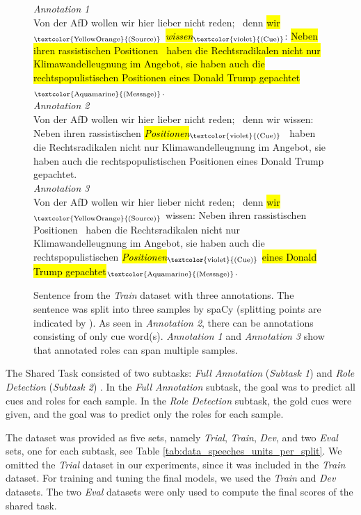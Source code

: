 \documentclass[11pt,a4paper]{article}
\newcommand{\cue}[1]{\sethlcolor{cue}\hl{\emph{#1}}$_{\text{\textcolor{violet}{(Cue)}}}$}
\newcommand{\source}[1]{\sethlcolor{source}\hl{#1}$_{\text{\textcolor{YellowOrange}{(Source)}}}$}
\newcommand{\msg}[1]{\sethlcolor{message}\hl{#1}$_{\text{\textcolor{Aquamarine}{(Message)}}}$}
\begin{document}
\begin{figure}[t]
    \centering
    \begin{mdframed}[
            leftmargin=0pt,
            rightmargin=0pt,
            skipabove=0pt,
            skipbelow=0pt,
        ]
        \small
        \emph{Annotation 1}
        \\
        Von der AfD wollen wir hier lieber nicht reden; \ddag\, denn \source{wir} \cue{wissen}: \msg{Neben ihren rassistischen Positionen \ddag\, haben die Rechtsradikalen nicht nur Klimawandelleugnung im Angebot, sie haben auch die rechtspopulistischen Positionen eines Donald Trump gepachtet}.
        \\

        \emph{Annotation 2}
        \\
        Von der AfD wollen wir hier lieber nicht reden; \ddag\, denn wir wissen: Neben ihren rassistischen \cue{Positionen} \ddag\, haben die Rechtsradikalen nicht nur Klimawandelleugnung im Angebot, sie haben auch die rechtspopulistischen Positionen eines Donald Trump gepachtet.
        \\

        \emph{Annotation 3}
        \\
        Von der AfD wollen wir hier lieber nicht reden; \ddag\, denn \source{wir} wissen: Neben ihren rassistischen Positionen \ddag\, haben die Rechtsradikalen nicht nur Klimawandelleugnung im Angebot, sie haben auch die rechtspopulistischen \cue{Positionen} \msg{eines Donald Trump gepachtet}.
    \end{mdframed}
    \caption{
        Sentence from the \emph{Train} dataset with three annotations.
        The sentence was split into three samples by spaCy (splitting points are indicated by \ddag).
        As seen in \emph{Annotation 2}, there can be annotations consisting of only cue word(s).
        \emph{Annotation 1} and \emph{Annotation 3} show that annotated roles can span multiple samples.
    }
    \label{fig:example_annotation}
\end{figure}

The Shared Task consisted of two subtasks: \emph{Full Annotation} (\emph{Subtask 1}) and \emph{Role Detection} (\emph{Subtask 2}) \cite{GermEval2023}.
In the \emph{Full Annotation} subtask, the goal was to predict all cues and roles for each sample.
In the \emph{Role Detection} subtask, the gold cues were given, and the goal was to predict only the roles for each sample.

The dataset was provided as five sets, namely \emph{Trial}, \emph{Train}, \emph{Dev}, and two \emph{Eval} sets, one for each subtask, see Table \ref{tab:data_speeches_units_per_split}.
We omitted the \emph{Trial} dataset in our experiments, since it was included in the \emph{Train} dataset.
For training and tuning the final models, we used the \emph{Train} and \emph{Dev} datasets.
The two \emph{Eval} datasets were only used to compute the final scores of the shared task.
\end{document}

